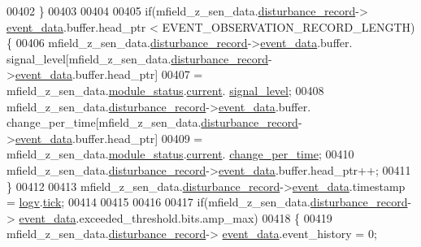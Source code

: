\begin{DoxyCode}
00402             \}
00403 
00404 
00405             \textcolor{keywordflow}{if}(mfield\_z\_sen\_data.\hyperlink{a00027_ac9b38e2c1d3f1013a88d33506c754152}{disturbance\_record}->
      \hyperlink{a00028_a8c0bda69e71ef674e60da47ad0be9ab0}{event\_data}.buffer.head\_ptr < EVENT\_OBSERVATION\_RECORD\_LENGTH)\{
00406             mfield\_z\_sen\_data.\hyperlink{a00027_ac9b38e2c1d3f1013a88d33506c754152}{disturbance\_record}->\hyperlink{a00028_a8c0bda69e71ef674e60da47ad0be9ab0}{event\_data}.buffer.
      signal\_level[mfield\_z\_sen\_data.\hyperlink{a00027_ac9b38e2c1d3f1013a88d33506c754152}{disturbance\_record}->\hyperlink{a00028_a8c0bda69e71ef674e60da47ad0be9ab0}{event\_data}.buffer.head\_ptr]
00407                     = mfield\_z\_sen\_data.\hyperlink{a00027_adfab5a5d8b45a93dfb13edb24e2b80e3}{module\_status}.\hyperlink{a00019_acf41ffc11da291c2f9f0fcb02ee72b98}{current}.
      \hyperlink{a00019_a4070db8eab0ff93e3fbc1df59872f117}{signal\_level};
00408             mfield\_z\_sen\_data.\hyperlink{a00027_ac9b38e2c1d3f1013a88d33506c754152}{disturbance\_record}->\hyperlink{a00028_a8c0bda69e71ef674e60da47ad0be9ab0}{event\_data}.buffer.
      change\_per\_time[mfield\_z\_sen\_data.\hyperlink{a00027_ac9b38e2c1d3f1013a88d33506c754152}{disturbance\_record}->\hyperlink{a00028_a8c0bda69e71ef674e60da47ad0be9ab0}{event\_data}.buffer.head\_ptr]
00409                     = mfield\_z\_sen\_data.\hyperlink{a00027_adfab5a5d8b45a93dfb13edb24e2b80e3}{module\_status}.\hyperlink{a00019_acf41ffc11da291c2f9f0fcb02ee72b98}{current}.
      \hyperlink{a00019_a0f645dd76b41adc6a966feba8e4bff8c}{change\_per\_time};
00410             mfield\_z\_sen\_data.\hyperlink{a00027_ac9b38e2c1d3f1013a88d33506c754152}{disturbance\_record}->\hyperlink{a00028_a8c0bda69e71ef674e60da47ad0be9ab0}{event\_data}.buffer.head\_ptr++;
00411             \}
00412 
00413             mfield\_z\_sen\_data.\hyperlink{a00027_ac9b38e2c1d3f1013a88d33506c754152}{disturbance\_record}->\hyperlink{a00028_a8c0bda69e71ef674e60da47ad0be9ab0}{event\_data}.timestamp = 
      \hyperlink{a00021_a2e89c46668b39a17753c238950c9e1ec}{logv}.\hyperlink{a00021_a81f0ce68c2c483fb8df726cc1988d8e8}{tick};
00414 
00415 
00416 
00417              \textcolor{keywordflow}{if}(mfield\_z\_sen\_data.\hyperlink{a00027_ac9b38e2c1d3f1013a88d33506c754152}{disturbance\_record}->
      \hyperlink{a00028_a8c0bda69e71ef674e60da47ad0be9ab0}{event\_data}.exceeded\_threshold.bits.amp\_max)
00418              \{
00419                 mfield\_z\_sen\_data.\hyperlink{a00027_ac9b38e2c1d3f1013a88d33506c754152}{disturbance\_record}->
      \hyperlink{a00028_a8c0bda69e71ef674e60da47ad0be9ab0}{event\_data}.event\_history = 0;

\end{DoxyCode}
